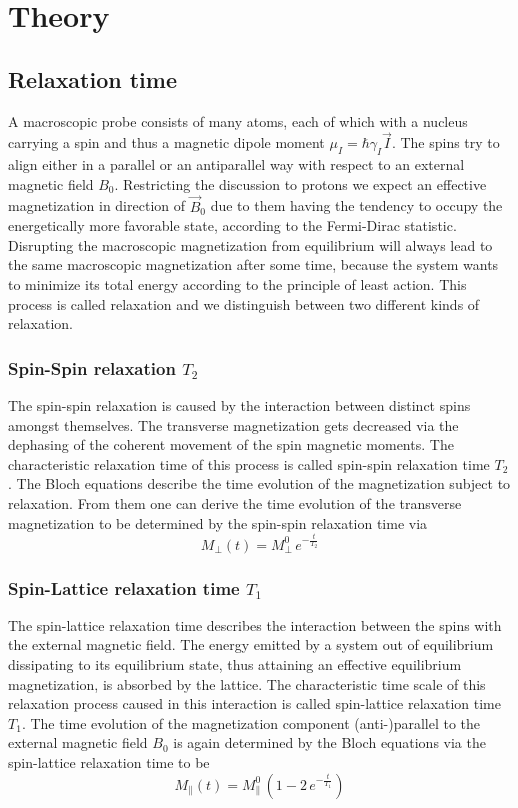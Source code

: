 \section{Theory}
\subsection{Relaxation time}
A macroscopic probe consists of many atoms, each of which with a nucleus carrying a spin and thus a magnetic dipole moment $\mu _I = \hbar \gamma _I \vec{I}$. The spins try to align either in a parallel or an antiparallel way with respect to an external magnetic field $B_0$. Restricting the discussion to protons we expect an effective magnetization in direction of $\vec{B}_0$ due to them having the tendency to occupy the energetically more favorable state, according to the Fermi-Dirac statistic. Disrupting the macroscopic magnetization from equilibrium will always lead to the same macroscopic magnetization after some time, because the system wants to minimize its total energy according to the principle of least action. This process is called relaxation and we distinguish between two different kinds of relaxation.\cite{manual} \cite{MRI}

\subsubsection{Spin-Spin relaxation $T_2$}
The spin-spin relaxation is caused by the interaction between distinct spins amongst themselves. The transverse magnetization gets decreased via the dephasing of the coherent movement of the spin magnetic moments. The characteristic relaxation time of this process is called spin-spin relaxation time $T_2$.
The Bloch equations describe the time evolution of the magnetization subject to relaxation. From them one can derive the time evolution of the transverse magnetization to be determined by the spin-spin relaxation time via \cite{manual}
\begin{equation}
	M_{\perp} (t) = M^0 _{\perp}\, e^{-\frac{t}{T_2}}
	\label{eq:2}
\end{equation}
\subsubsection{Spin-Lattice relaxation time $T_1$}
 The spin-lattice relaxation time describes the interaction between the spins with the external magnetic field. The energy emitted by a system out of equilibrium dissipating to its equilibrium state, thus attaining an effective equilibrium magnetization, is absorbed by the lattice. The characteristic time scale of this relaxation process caused in this interaction is called spin-lattice relaxation time $T_1$. The time evolution of the magnetization component (anti-)parallel to the external magnetic field $B_0$ is again determined by the Bloch equations via the spin-lattice relaxation time to be \cite{manual} \cite{MRI}
 \begin{equation}
 	M_{\parallel}(t) = M^0 _{\parallel} \, \left(1-2\, e^{-\frac{t}{T_1}}\right)
 	\label{eq:3}
 \end{equation}

